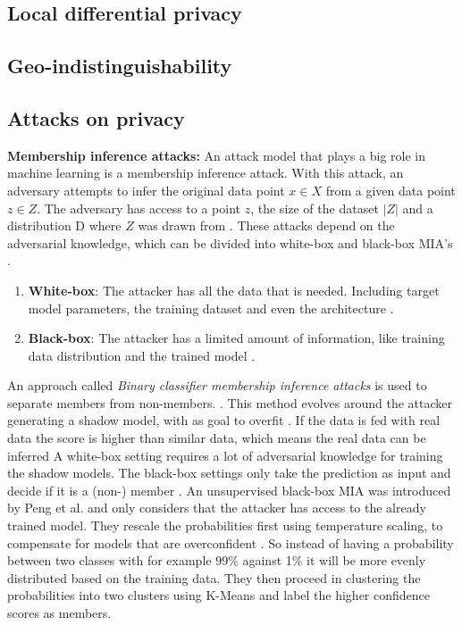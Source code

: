 \subsection{Local differential privacy}
\subsection{Geo-indistinguishability}
\subsection{Attacks on privacy} \label{section: MIA}
\textbf{Membership inference attacks:}
An attack model that plays a big role in machine learning is a membership inference attack.
With this attack, an adversary attempts to infer the original data point $x \in X$ from a given data point $z \in Z$.
The adversary has access to a point $z$, the size of the dataset $|Z|$ and a distribution D where $Z$ was drawn from \citep{yeom_privacy_2018}.
These attacks depend on the adversarial knowledge, which can be divided into white-box and black-box MIA's \citep{hu_membership_2022}.
\begin{enumerate}
  \item \textbf{White-box}: The attacker has all the data that is needed. Including target model parameters, the training dataset and even the architecture \citep{hu_membership_2022}.
  \item \textbf{Black-box}: The attacker has a limited amount of information, like training data distribution and the trained model \citep{hu_membership_2022}.
\end{enumerate}

An approach called \textit{Binary classifier membership inference attacks} is used to separate members from non-members. \citep{hu_membership_2022}.
This method evolves around the attacker generating a shadow model, with as goal to overfit \citep{shokri_membership_2017}.
If the data is fed with real data the score is higher than similar data, which means the real data can be inferred \citep{shokri_membership_2017,jayaraman_evaluating_nodate}
A white-box setting requires a lot of adversarial knowledge for training the shadow models.
The black-box settings only take the prediction as input and decide if it is a (non-) member \citep{hu_membership_2022}.
An unsupervised black-box MIA was introduced by Peng et al. and only considers that the attacker has access to the already trained model.
They rescale the probabilities first using temperature scaling, to compensate for models that are overconfident \citep{peng_unsupervised_nodate}.
So instead of having a probability between two classes with for example 99\% against 1\% it will be more evenly distributed based on the training data.
They then proceed in clustering the probabilities into two clusters using K-Means and label the higher confidence scores as members.

